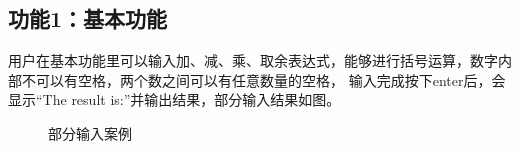 \documentclass[a4paper, 11pt, UTF8]{ctexart}
\begin{document}
\subsection{功能1：基本功能}

用户在基本功能里可以输入加、减、乘、取余表达式，能够进行括号运算，数字内部不可以有空格，两个数之间可以有任意数量的空格，
输入完成按下enter后，会显示“The result is:”并输出结果，部分输入结果如图。

\begin{figure}[H]
    \centering
    \quad
    \quad
    \quad
    \caption{部分输入案例}
\end{figure}
\end{document}
